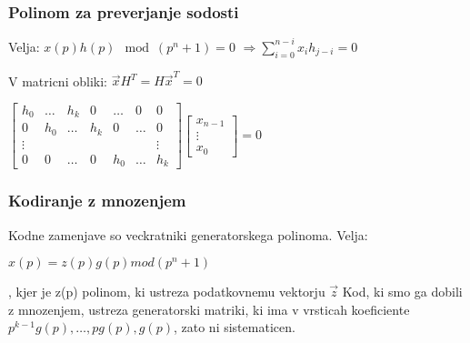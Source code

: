 \documentclass{article}
\begin{document}
\begin{multicols}{3}
\subsubsection{Polinom za preverjanje sodosti}
Velja: $x(p)h(p) \mod(p^n + 1) = 0$ $\Rightarrow \sum_{i=0}^{n-i} x_i h_{j-i} = 0$

V matricni obliki: $\vec{x} H^T = H\vec{x}^T = 0$
\begin{center}
    \begin{tiny}
        \begin{math}
            \begin{bmatrix}
                h_0 & \dots & h_k & 0 & \dots & 0 & 0\\
                0 & h_0 & \dots & h_k & 0 & \dots & 0 \\
                \vdots & & & & & & \vdots \\
                0 & 0 & \dots & 0 & h_0 & \dots & h_k
            \end{bmatrix}
            \begin{bmatrix}
                x_{n-1}\\
                \vdots\\
                x_0
            \end{bmatrix} = 0
        \end{math}
    \end{tiny}
\end{center}

\subsubsection{Kodiranje z mnozenjem}
Kodne zamenjave so veckratniki generatorskega polinoma.
Velja:
\begin{center}
    \begin{math}
        x(p) = z(p) g(p) mod (p^n + 1)
    \end{math}
\end{center}, kjer je z(p) polinom, ki ustreza podatkovnemu vektorju $\vec{z}$
Kod, ki smo ga dobili z mnozenjem, ustreza generatorski matriki, ki ima v vrsticah
koeficiente $p^{k-1}g(p), \dots, pg(p), g(p)$, zato ni sistematicen.


\end{multicols}
\end{document}
